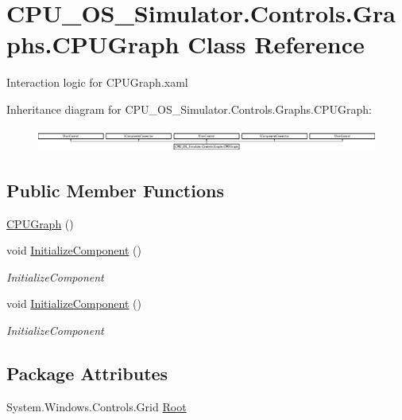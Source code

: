 \hypertarget{class_c_p_u___o_s___simulator_1_1_controls_1_1_graphs_1_1_c_p_u_graph}{}\section{C\+P\+U\+\_\+\+O\+S\+\_\+\+Simulator.\+Controls.\+Graphs.\+C\+P\+U\+Graph Class Reference}
\label{class_c_p_u___o_s___simulator_1_1_controls_1_1_graphs_1_1_c_p_u_graph}


Interaction logic for C\+P\+U\+Graph.\+xaml  


Inheritance diagram for C\+P\+U\+\_\+\+O\+S\+\_\+\+Simulator.\+Controls.\+Graphs.\+C\+P\+U\+Graph\+:\begin{figure}[H]
\begin{center}
\leavevmode
\includegraphics[height=0.775087cm]{class_c_p_u___o_s___simulator_1_1_controls_1_1_graphs_1_1_c_p_u_graph}
\end{center}
\end{figure}
\subsection*{Public Member Functions}
\begin{DoxyCompactItemize}
\item 
\hyperlink{class_c_p_u___o_s___simulator_1_1_controls_1_1_graphs_1_1_c_p_u_graph_a625aff911242a4f4328714c0f42e9c99}{C\+P\+U\+Graph} ()
\item 
void \hyperlink{class_c_p_u___o_s___simulator_1_1_controls_1_1_graphs_1_1_c_p_u_graph_af9fdc415d177c3c5e7636113817a0922}{Initialize\+Component} ()
\begin{DoxyCompactList}\small\item\em Initialize\+Component \end{DoxyCompactList}\item 
void \hyperlink{class_c_p_u___o_s___simulator_1_1_controls_1_1_graphs_1_1_c_p_u_graph_af9fdc415d177c3c5e7636113817a0922}{Initialize\+Component} ()
\begin{DoxyCompactList}\small\item\em Initialize\+Component \end{DoxyCompactList}\end{DoxyCompactItemize}
\subsection*{Package Attributes}
\begin{DoxyCompactItemize}
\item 
System.\+Windows.\+Controls.\+Grid \hyperlink{class_c_p_u___o_s___simulator_1_1_controls_1_1_graphs_1_1_c_p_u_graph_af9993709cdbe673f572a3dc4562293a6}{Root}
\end{DoxyCompactItemize}
